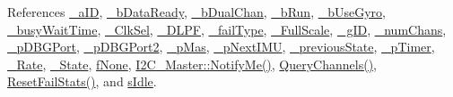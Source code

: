 References \hyperlink{_i_m_u_8h_source_l00094}{\_\-aID}, \hyperlink{_i_m_u_8h_source_l00104}{\_\-bDataReady}, \hyperlink{_i_m_u_8h_source_l00090}{\_\-bDualChan}, \hyperlink{_i_m_u_8h_source_l00107}{\_\-bRun}, \hyperlink{_i_m_u_8h_source_l00100}{\_\-bUseGyro}, \hyperlink{_i_m_u_8h_source_l00111}{\_\-busyWaitTime}, \hyperlink{_i_m_u_8h_source_l00097}{\_\-ClkSel}, \hyperlink{_i_m_u_8h_source_l00095}{\_\-DLPF}, \hyperlink{_i_m_u_8h_source_l00087}{\_\-failType}, \hyperlink{_i_m_u_8h_source_l00096}{\_\-FullScale}, \hyperlink{_i_m_u_8h_source_l00093}{\_\-gID}, \hyperlink{_i_m_u_8h_source_l00091}{\_\-numChans}, \hyperlink{_i_m_u_8h_source_l00112}{\_\-pDBGPort}, \hyperlink{_i_m_u_8h_source_l00113}{\_\-pDBGPort2}, \hyperlink{_i_m_u_8h_source_l00089}{\_\-pMas}, \hyperlink{_i_m_u_8h_source_l00114}{\_\-pNextIMU}, \hyperlink{_i_m_u_8h_source_l00086}{\_\-previousState}, \hyperlink{_i_m_u_8h_source_l00106}{\_\-pTimer}, \hyperlink{_i_m_u_8h_source_l00098}{\_\-Rate}, \hyperlink{_i_m_u_8h_source_l00085}{\_\-State}, \hyperlink{_i_m_u_8h_source_l00066}{fNone}, \hyperlink{class_i2_c___master_a608731d8ae2cf3c9141dd4579f74d5f7}{I2C\_\-Master::NotifyMe()}, \hyperlink{_i_m_u_8cpp_source_l00120}{QueryChannels()}, \hyperlink{_i_m_u_8h_source_l00200}{ResetFailStats()}, and \hyperlink{_i_m_u_8h_source_l00043}{sIdle}.


